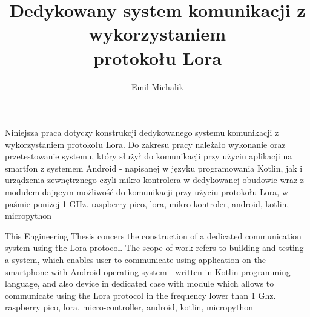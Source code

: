 \documentclass[
    left=2.5cm,         %
    right=2.5cm,        %
    top=2.5cm,          %
    bottom=3cm,         %
    bindingoffset=6mm,  %
    nohyphenation=false %
]{eiti/eiti-thesis}
\begin{document}
\EngineerThesis %
{}
\title{
    Dedykowany system komunikacji z wykorzystaniem \\
    protokołu Lora
}
\author{{Emil Michalik}}
\date{\the\year}
\maketitle

\cleardoublepage %
\streszczenie
Niniejsza praca dotyczy konstrukcji dedykowanego systemu komunikacji z wykorzystaniem protokołu Lora.
Do zakresu pracy należało wykonanie oraz przetestowanie systemu, który służył do komunikacji przy użyciu aplikacji na smartfon z systemem Android - napisanej w języku programowania Kotlin, jak i urządzenia zewnętrznego czyli mikro-kontrolera w dedykowanej obudowie wraz z modułem dającym możliwość do komunikacji przy użyciu protokołu Lora, w paśmie poniżej 1 GHz.
\slowakluczowe raspberry pico, lora, mikro-kontroler, android, kotlin, micropython

\newpage
\abstract
This Engineering Thesis concers the construction of a dedicated communication system using the Lora protocol.
The scope of work refers to building and testing a system, which enables user to communicate using application on the smartphone with Android operating system - written in Kotlin programming language, and also device in dedicated case with module which allows to communicate using the Lora protocol in the frequency lower than 1 Ghz.
\keywords raspberry pico, lora, micro-controller, android, kotlin, micropython

\cleardoublepage  %
\pagestyle{plain}
\makeauthorship

\cleardoublepage %
\tableofcontents
\end{document}
